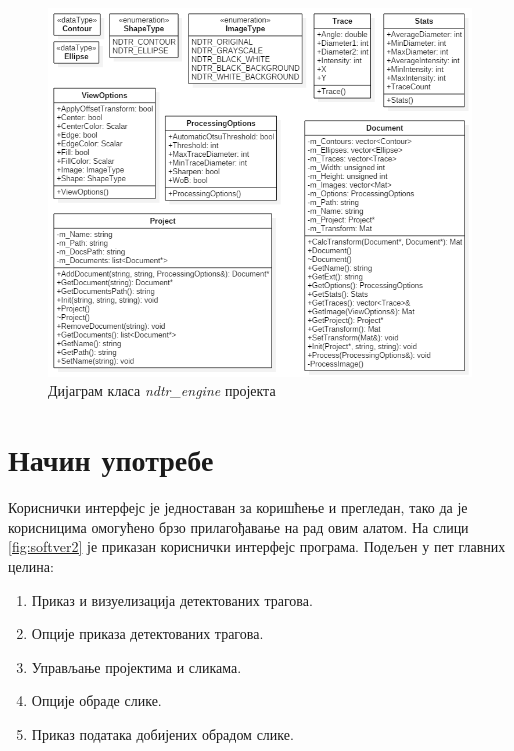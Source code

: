 \documentclass[11pt,a4paper,serbian,oneside]{book}
\begin{document}
\begin{figure}[H]
\begin{center}
\includegraphics[width=150mm]{images/engine.png}
\end{center}
\caption{Дијаграм класа \textit{ndtr\_engine} пројекта}
\label{fig:engine}
\end{figure}

\section{Начин употребе}

Кориснички интерфејс је једноставан за коришћење и прегледан, тако да је корисницима омогућено брзо прилагођавање на рад овим алатом. На слици \ref{fig:softver2} је приказан кориснички интерфејс програма. Подељен у пет главних целина:
\begin{enumerate}
  \item Приказ и визуелизација детектованих трагова.
  \item Опције приказа детектованих трагова.
  \item Управљање пројектима и сликама.
  \item Опције обраде слике.
  \item Приказ података добијених обрадом слике.
\end{enumerate}
\end{document}
